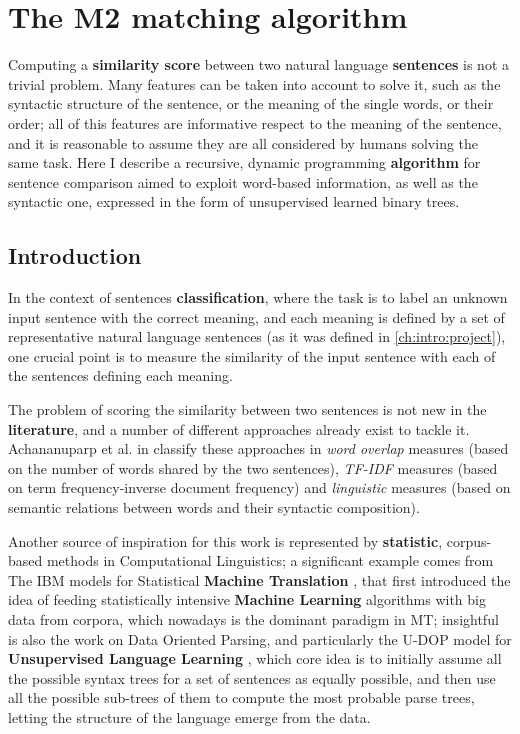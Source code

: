 
\chapter{The M2 matching algorithm} %

\label{ch:M2} %


Computing a \textbf{similarity score} between two natural language \textbf{sentences} is not a trivial problem. Many features can be taken into account to solve it, such as the syntactic structure of the sentence, or the meaning of the single words, or their order; all of this features are informative respect to the meaning of the sentence, and it is reasonable to assume they are all considered by humans solving the same task. Here I describe a recursive, dynamic programming \textbf{algorithm} for sentence comparison aimed to exploit word-based information, as well as the syntactic one, expressed in the form of unsupervised learned binary trees.

\section{Introduction}
In the context of sentences \textbf{classification}, where the task is to label an unknown input sentence with the correct meaning, and each meaning is defined by a set of representative natural language sentences (as it was defined in \ref{ch:intro:project}), one crucial point is to measure the similarity of the input sentence with each of the sentences defining each meaning.

The problem of scoring the similarity between two sentences is not new in the \textbf{literature}, and a number of different approaches already exist to tackle it. Achananuparp et al. in \cite{achananuparp08} classify these approaches in \emph{word overlap} measures (based on the number of words shared by the two sentences), \emph{TF-IDF} measures (based on term frequency-inverse document frequency) and \emph{linguistic} measures (based on semantic relations between words and their syntactic composition).

Another source of inspiration for this work is represented by \textbf{statistic}, corpus-based methods in Computational Linguistics; a significant example comes from The IBM models for Statistical \textbf{Machine Translation} \cite{ibmmt}, that first introduced the idea of feeding statistically intensive \textbf{Machine Learning} algorithms with big data from corpora, which nowadays is the dominant paradigm in MT; insightful is also the work on Data Oriented Parsing, and particularly the U-DOP model for \textbf{Unsupervised Language Learning} \cite{udop}, which core idea is to initially assume all the possible syntax trees for a set of sentences as equally possible, and then use all the possible sub-trees of them to compute the most probable parse trees, letting the structure of the language emerge from the data.

